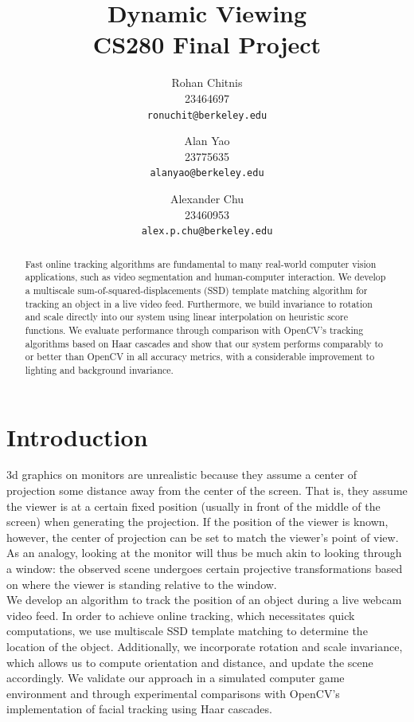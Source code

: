 \documentclass[10pt,twocolumn,letterpaper]{article}
\begin{document}
\title{Dynamic Viewing\\CS280 Final Project}

\author{Rohan Chitnis\\
23464697\\
{\tt\small ronuchit@berkeley.edu}
\and
Alan Yao\\
23775635\\
{\tt\small alanyao@berkeley.edu}
\and
Alexander Chu\\
23460953\\
{\tt\small alex.p.chu@berkeley.edu}
}

\maketitle

\begin{abstract}
  Fast online tracking algorithms are fundamental to many real-world computer
  vision applications, such as video segmentation and human-computer interaction.
  We develop a multiscale sum-of-squared-displacements (SSD) template matching algorithm for
  tracking an object in a live video feed. Furthermore, we build invariance
  to rotation and scale directly into our system using linear interpolation on heuristic
  score functions. We evaluate performance through comparison with OpenCV's tracking
  algorithms based on Haar cascades \cite{haarcascade} and show that our system performs comparably to or
  better than OpenCV in all accuracy metrics, with a considerable improvement to
  lighting and background invariance.
\end{abstract}

\section*{Introduction}
3d graphics on monitors are unrealistic because they assume a center of projection
some distance away from the center of the screen. That is, they assume the viewer
is at a certain fixed position (usually in front of the middle of the screen) when
generating the projection. If the position of the viewer is known, however, the
center of projection can be set to match the viewer's point of view. As an analogy,
looking at the monitor will thus be much akin to looking through a window: the observed
scene undergoes certain projective transformations based on where the viewer is standing
relative to the window.\\

We develop an algorithm to track the position of an object
during a live webcam video feed. In order to achieve online tracking, which necessitates
quick computations, we use multiscale SSD template matching to determine the location of
the object. Additionally, we incorporate rotation and scale invariance, which allows us to
compute orientation and distance, and update the scene accordingly. We validate our
approach in a simulated computer game environment and through experimental comparisons
with OpenCV's implementation of facial tracking using Haar cascades.
\end{document}
